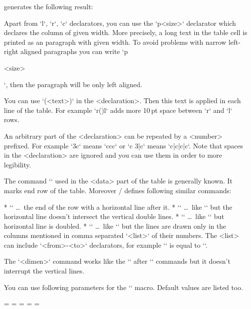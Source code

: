\begtt
{}
\endtt
%
generates the following result:

\bigskip
\hfil{}
\bigskip

Apart from `l`, `r`, `c` declarators, you can use the `p{<size>}` declarator
which declares the column of given width. More precisely, a long text in
the table cell is printed as an paragraph with given width.
To avoid problems with narrow left-right aligned paragraphs you can write
`p{<size>\raggedright}`, then the paragraph will be only left aligned.

You can use `(<text>)` in the <declaration>. Then this text is applied in
each line of the table. For example `r(\kern10pt)l` adds more 10\,pt space
between `r` and `l` rows. 

An arbitrary part of the <declaration> can be repeated by a <number>
prefixed. For example `3c` means `ccc` or `c 3{|c}` means
`c|c|c|c`. Note that spaces in the <declaration> are ignored and you 
can use them in order to more legibility.
 
The command `\cr` used in the <data> part of the table 
is generally known. It marks end row of the table. 
Moreover \OpTeX/ defines following similar commands:

\begitems
* `\crl` \dots\ the end of the row with a horizontal line after it.
* `\crli` \dots\ like `\crl` but the horizontal line doesn't intersect the
      vertical double lines.
* `\crlli` \dots\ like `\crli` but horizontal line is doubled.
* `` \dots\ like `\crli` but the lines are drawn only in the
  columns mentioned in comma separated `<list>` of their numbers.
  The <list> can include `<from>-<to>` declarators, for example
  `` is equal to ``. 
\enditems

The `\tskip<dimen>` command works like the `` 
after `\cr*` commands but it doesn't interrupt the vertical lines.

\new
You can use following parameters for the `\table` macro. Default values are listed
too. 

\begtt
\everytable={}       %
\thistable={}        %
\tabiteml={\enspace} %
\tabitemr={\enspace} %
\tabstrut={\strut}   %
\tablinespace=2pt    %
\vvkern=1pt          %
\hhkern=1pt          %
\endtt

